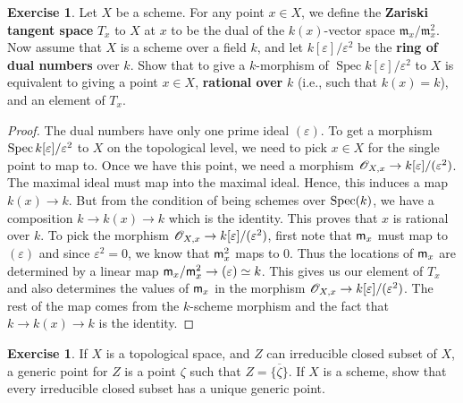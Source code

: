 \documentclass[]{pcmi}
\theoremstyle{plain}
\theoremstyle{definition}
\newtheorem{Exercise}[subsubsection]{Exercise}
\theoremstyle{remark}
\begin{document}
\begin{Exercise}
    Let $X$ be a scheme. For any point $x \in X$, we define the \textbf{Zariski tangent space} $T_x$ to $X$ at $x$ to be the dual of the $k(x)$-vector space $\mathfrak{m}_x/\mathfrak{m}_x^2$. Now assume that $X$ is a scheme over a field $k$, and let $k[\varepsilon]/\varepsilon^2$ be the \textbf{ring of dual numbers} over $k$. Show that to give a $k$-morphism of $\operatorname{Spec} k[\varepsilon]/\varepsilon^2$ to $X$ is equivalent to giving a point $x \in X$, \textbf{rational over} $k$ (i.e., such that $k(x) = k$), and an element of $T_x$.
\end{Exercise}

\begin{proof}
    The dual numbers have only one prime ideal $(\varepsilon)$. To get a morphism $\operatorname{Spec} k[\varepsilon] / \varepsilon^2$ to $X$ on the topological level, we need to pick $x \in X$ for the single point to map to. Once we have this point, we need a morphism $\mathscr{O}_{X, x} \to k[\varepsilon] / (\varepsilon^2)$. The maximal ideal must map into the maximal ideal. Hence, this induces a map $k(x) \to k$. But from the condition of being schemes over $\operatorname{Spec}(k)$, we have a composition $k \to k(x) \to k$ which is the identity. This proves that $x$ is rational over $k$. To pick the morphism $\mathscr{O}_{X, x} \to k[\varepsilon] / (\varepsilon^2)$, first note that $\mathsf{m}_x$ must map to $(\varepsilon)$ and since $\varepsilon^2 = 0$, we know that $\mathsf{m}_x^2$ maps to $0$. Thus the locations of $\mathsf{m}_x$ are determined by a linear map $\mathsf{m}_x / \mathsf{m}_x^2 \to (\varepsilon) \simeq k$. This gives us our element of $T_x$ and also determines the values of $\mathsf{m}_x$ in the morphism $\mathscr{O}_{X, x} \to k[\varepsilon] / (\varepsilon^2)$. The rest of the map comes from the $k$-scheme morphism and the fact that $k \to k(x) \to k$ is the identity. 
\end{proof}

\begin{Exercise}
    If $X$ is a topological space, and $Z$ can irreducible closed subset of $X$, a generic point for $Z$ is a point $\zeta$ such that $Z = \overline{\{\zeta\}}$. If $X$ is a scheme, show that every irreducible closed subset has a unique generic point. 
\end{Exercise}
\end{document}
